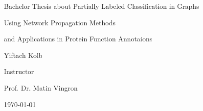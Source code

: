 \documentclass[a4paper,10pt]{article}
\theoremstyle{definition}
\theoremstyle{remark}
\theoremstyle{plain}
\begin{document}
\renewcommand{\thesubsection}{\thesection.\alph{subsection}}\renewcommand{\thesubsection}{\thesection.\alph{subsection}}

\begin{titlepage}
	\centering
    {\scshape\LARGE \par Bachelor Thesis about Partially Labeled
    Classification in Graphs
    \par Using Network Propagation Methods 
    \par and Applications in Protein Function Annotaions}
    \vfill
  	{\Large Yiftach Kolb \par}
    \vfill
	  {\Large Instructor\par
    Prof. Dr. Matin Vingron 
    \par}
    {\large \today\par}
\end{titlepage}






\begin{abstract}
This is an abstract \dots
\end{abstract}
\end{document}
